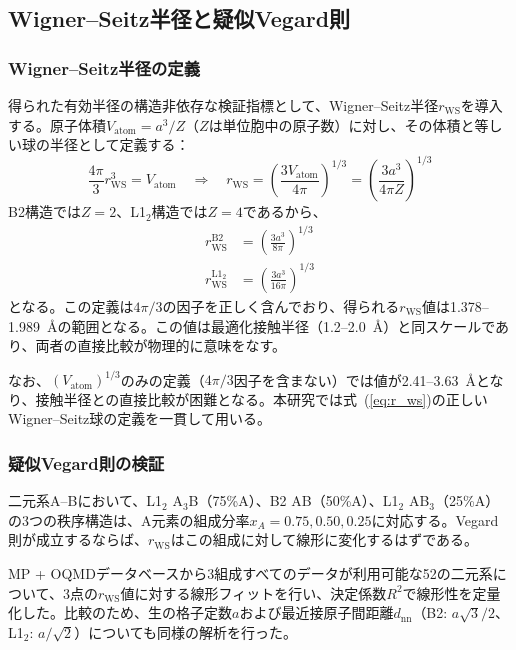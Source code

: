 \documentclass[a4paper,10pt,5p]{elsarticle}
\begin{document}
\subsection{Wigner--Seitz半径と疑似Vegard則}

\subsubsection{Wigner--Seitz半径の定義}
得られた有効半径の構造非依存な検証指標として、Wigner--Seitz半径$r_\mathrm{WS}$を導入する。原子体積$V_\mathrm{atom} = a^3/Z$（$Z$は単位胞中の原子数）に対し、その体積と等しい球の半径として定義する：
\begin{equation}
    \frac{4\pi}{3}r_\mathrm{WS}^3 = V_\mathrm{atom} \quad\Longrightarrow\quad
    r_\mathrm{WS} = \left(\frac{3V_\mathrm{atom}}{4\pi}\right)^{1/3} = \left(\frac{3a^3}{4\pi Z}\right)^{1/3}
    \label{eq:r_ws}
\end{equation}
B2構造では$Z = 2$、L1$_2$構造では$Z = 4$であるから、
\begin{align}
    r_\mathrm{WS}^\mathrm{B2} &= \left(\frac{3a^3}{8\pi}\right)^{1/3} \label{eq:rws_b2} \\
    r_\mathrm{WS}^\mathrm{L1_2} &= \left(\frac{3a^3}{16\pi}\right)^{1/3} \label{eq:rws_l12}
\end{align}
となる。この定義は$4\pi/3$の因子を正しく含んでおり、得られる$r_\mathrm{WS}$値は1.378--1.989~\AA の範囲となる。この値は最適化接触半径（1.2--2.0~\AA）と同スケールであり、両者の直接比較が物理的に意味をなす。

なお、$(V_\mathrm{atom})^{1/3}$のみの定義（$4\pi/3$因子を含まない）では値が2.41--3.63~\AA となり、接触半径との直接比較が困難となる。本研究では式~(\ref{eq:r_ws})の正しいWigner--Seitz球の定義を一貫して用いる。

\subsubsection{疑似Vegard則の検証}
二元系A--Bにおいて、L1$_2$ A$_3$B（75\%A）、B2 AB（50\%A）、L1$_2$ AB$_3$（25\%A）の3つの秩序構造は、A元素の組成分率$x_A = 0.75, 0.50, 0.25$に対応する。Vegard則が成立するならば、$r_\mathrm{WS}$はこの組成に対して線形に変化するはずである。

MP + OQMDデータベースから3組成すべてのデータが利用可能な52の二元系について、3点の$r_\mathrm{WS}$値に対する線形フィットを行い、決定係数$R^2$で線形性を定量化した。比較のため、生の格子定数$a$および最近接原子間距離$d_\mathrm{nn}$（B2: $a\sqrt{3}/2$、L1$_2$: $a/\sqrt{2}$）についても同様の解析を行った。
\end{document}
